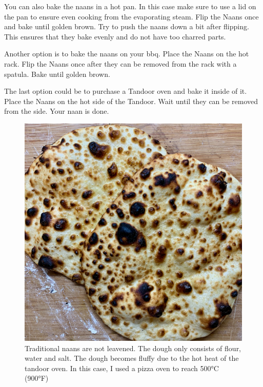 You can also bake the naans in a hot pan. In this case make sure to use a lid
on the pan to ensure even cooking from the evaporating steam. Flip the Naans
once and bake until golden brown. Try to push the naans down a bit after
flipping. This ensures that they bake evenly and do not have too charred
parts.

Another option is to bake the naans on your bbq. Place the Naans on the hot
rack. Flip the Naans once after they can be removed from the rack with a
spatula. Bake until golden brown.

The last option could be to purchase a Tandoor oven and bake it inside of it.
Place the Naans on the hot side of the Tandoor. Wait until they can be removed
from the side. Your naan is done.

\begin{figure}[h]
    \centering
    \includegraphics[width=\textwidth]{naan-traditional}
    \caption{Traditional naans are not leavened. The dough only consists of
    flour, water and salt. The dough becomes fluffy due to the hot heat of the
    tandoor oven. In this case, I used a pizza oven to reach 500°C (900°F)}
\end{figure}
